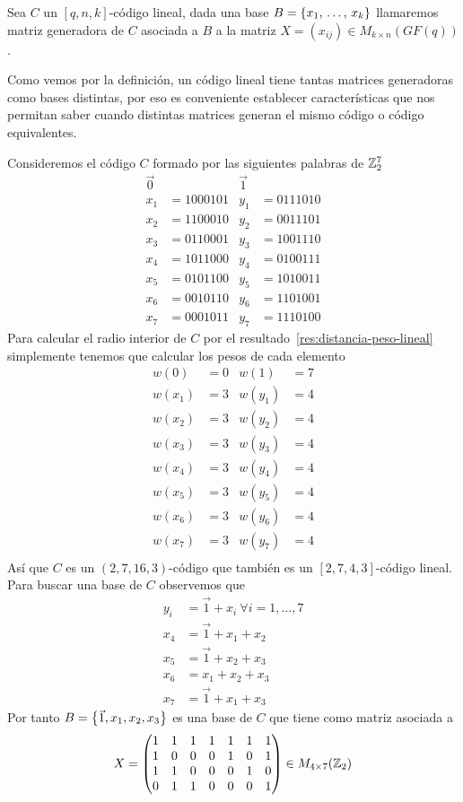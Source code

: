 \begin{definition}
	Sea $C$ un $[q, n, k]$-código lineal, dada una base $B=\left\{x_1,\thinspace \dots ,\thinspace x_k\right\}$ llamaremos matriz generadora de $C$ asociada a $B$ a la matriz $X=(x_{ij})\in M_{k\times n}(GF(q))$.
\end{definition}
Como vemos por la definición, un código lineal tiene tantas matrices generadoras como bases distintas, por eso es conveniente establecer características que nos permitan saber cuando distintas matrices generan el mismo código o código equivalentes.
\begin{example}
	\label{ex:matriz-generador}
	Consideremos el código $C$ formado por las siguientes palabras de $\mathbb{Z}_2^7$
	\begin{align*}
		\vec{0} & \ & \vec{1} & \ \\
		x_1 &= 1000101 & y_1 &= 0111010\\
		x_2 &= 1100010 & y_2 &= 0011101\\
		x_3 &= 0110001 & y_3 &= 1001110\\
		x_4 &= 1011000 & y_4 &= 0100111\\
		x_5 &= 0101100 & y_5 &= 1010011\\
		x_6 &= 0010110 & y_6 &= 1101001\\
		x_7 &= 0001011 & y_7 &= 1110100
	\end{align*}
	Para calcular el radio interior de $C$ por el resultado~\eqref{res:distancia-peso-lineal} simplemente tenemos que calcular los pesos de cada elemento
	\begin{align*}
		w(0) &= 0 & w(1) &= 7 \\
		w(x_1) &= 3 & w(y_1) &= 4 \\
		w(x_2) &= 3 & w(y_2) &= 4 \\
		w(x_3) &= 3 & w(y_3) &= 4 \\
		w(x_4) &= 3 & w(y_4) &= 4 \\
		w(x_5) &= 3 & w(y_5) &= 4 \\
		w(x_6) &= 3 & w(y_6) &= 4 \\
		w(x_7) &= 3 & w(y_7) &= 4 \\
	\end{align*}
	Así que $C$ es un $(2, 7, 16, 3)$-código que también es un $[2, 7, 4, 3]$-código lineal.
	Para buscar una base de $C$ observemos que
	\begin{align*}
		y_i &= \vec{1}+x_i\ \forall i=1,\dots, 7\\
		x_4 &= \vec{1}+x_1+x_2\\
		x_5 &= \vec{1}+x_2+x_3\\
		x_6 &= x_1+x_2+x_3\\
		x_7 &= \vec{1}+x_1+x_3
	\end{align*}
	Por tanto $B=\left\{\vec{1}, x_1, x_2, x_3\right\}$ es una base de $C$ que tiene como matriz asociada a
	\[
		X=\begin{pmatrix*}
			  1&1&1&1&1&1&1\\
			  1&0&0&0&1&0&1\\
			  1&1&0&0&0&1&0\\
			  0&1&1&0&0&0&1
		\end{pmatrix*}\in M_{4\times 7}(\Z_2)
	\]
\end{example}

